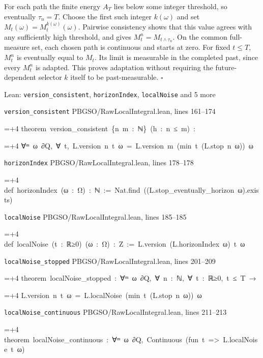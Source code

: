 \documentclass[11pt,a4paper]{report}
\newlength{\leancharwidth}
\newenvironment{leancode}{\par\smallskip\begingroup\ttfamily\footnotesize\raggedright
  \settowidth{\leancharwidth}{M}\setlength{\parskip}{0pt}\setlength{\parindent}{0pt}
  \frenchspacing}{\par\endgroup\smallskip}
\newcommand{\leanline}[2]{\hangindent=\dimexpr#1\leancharwidth+4\leancharwidth\relax
  \hangafter=1\noindent\hspace*{#1\leancharwidth}#2\par}
\newcommand{\leansource}[1]{\par{\footnotesize\color{leanmuted}#1}\par}
\begin{document}
For each path the finite energy \(A_T\) lies below some integer threshold, so eventually \(\tau_n=T\). Choose the first such integer \(k(\omega)\) and set \(M_t(\omega)=M^{k(\omega)}_t(\omega)\). Pairwise consistency shows that this value agrees with any sufficiently high threshold, and gives \(M^n_t=M_{t\wedge\tau_n}\). On the common full-measure set, each chosen path is continuous and starts at zero. For fixed \(t\le T\), \(M_t^n\) is eventually equal to \(M_t\). Its limit is measurable in the completed past, since every \(M_t^n\) is adapted. This proves adaptation without requiring the future-dependent selector \(k\) itself to be past-measurable. \(\square\)

\begin{leanbox}{Lean: \texttt{version\_\allowbreak{}consistent}, \texttt{horizonIndex}, \texttt{localNoise} and 5 more}
\leansource{\texttt{version\_\allowbreak{}consistent} \quad PBGSO/\allowbreak{}RawLocalIntegral.lean, lines 161–174}
\begin{leancode}
\leanline{0}{theorem\ version\_consistent\ \{n\ m\ :\ ℕ\}\ (h\ :\ n\ ≤\ m)\ :}
\leanline{4}{∀ᵐ\ ω\ ∂Q,\ ∀\ t,\ L.version\ n\ t\ ω\ =\ L.version\ m\ (min\ t\ (L.stop\ n\ ω))\ ω}
\end{leancode}
\leansource{\texttt{horizonIndex} \quad PBGSO/\allowbreak{}RawLocalIntegral.lean, lines 178–178}
\begin{leancode}
\leanline{0}{def\ horizonIndex\ (ω\ :\ Ω)\ :\ ℕ\ :=\ Nat.find\ ((L.stop\_eventually\_horizon\ ω).exists)}
\end{leancode}
\leansource{\texttt{localNoise} \quad PBGSO/\allowbreak{}RawLocalIntegral.lean, lines 185–185}
\begin{leancode}
\leanline{0}{def\ localNoise\ (t\ :\ ℝ≥0)\ (ω\ :\ Ω)\ :\ Z\ :=\ L.version\ (L.horizonIndex\ ω)\ t\ ω}
\end{leancode}
\leansource{\texttt{localNoise\_\allowbreak{}stopped} \quad PBGSO/\allowbreak{}RawLocalIntegral.lean, lines 201–209}
\begin{leancode}
\leanline{0}{theorem\ localNoise\_stopped\ :\ ∀ᵐ\ ω\ ∂Q,\ ∀\ n\ :\ ℕ,\ ∀\ t\ :\ ℝ≥0,\ t\ ≤\ T\ →}
\leanline{4}{L.version\ n\ t\ ω\ =\ L.localNoise\ (min\ t\ (L.stop\ n\ ω))\ ω}
\end{leancode}
\leansource{\texttt{localNoise\_\allowbreak{}continuous} \quad PBGSO/\allowbreak{}RawLocalIntegral.lean, lines 211–213}
\begin{leancode}
\leanline{0}{theorem\ localNoise\_continuous\ :\ ∀ᵐ\ ω\ ∂Q,\ Continuous\ (fun\ t\ =>\ L.localNoise\ t\ ω)}
\end{leancode}

\end{leanbox}
\end{document}
